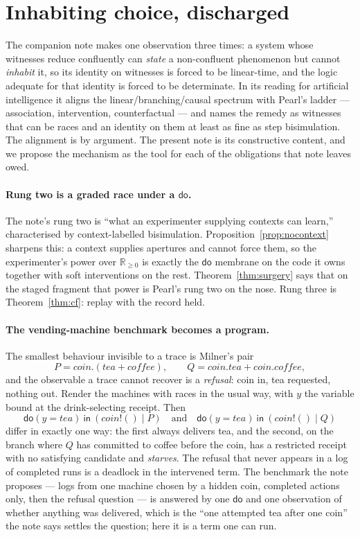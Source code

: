 \documentclass[11pt,a4paper]{article}
\theoremstyle{plain}
\theoremstyle{definition}
\theoremstyle{remark}
\newcommand{\Rnn}{\mathbb{R}_{\geq 0}}
\newcommand{\dok}{\textsf{do}}
\newcommand{\ink}{\textsf{in}}
\begin{document}
\section{Inhabiting choice, discharged}\label{sec:inhabiting}

The companion note \cite{Inhabiting} makes one observation three times: a
system whose witnesses reduce confluently can \emph{state} a non-confluent
phenomenon but cannot \emph{inhabit} it, so its identity on witnesses is forced
to be linear-time, and the logic adequate for that identity is forced to be
determinate. In its reading for artificial intelligence it aligns the
linear/branching/causal spectrum with Pearl's ladder --- association,
intervention, counterfactual --- and names the remedy as witnesses that can be
races and an identity on them at least as fine as step bisimulation. The
alignment is by argument. The present note is its constructive content, and we
propose the mechanism as the tool for each of the obligations that note leaves
owed.

\paragraph{Rung two is a graded race under a $\dok$.} The note's rung two is
``what an experimenter supplying contexts can learn,'' characterised by
context-labelled bisimulation. Proposition~\ref{prop:nocontext} sharpens this:
a context supplies apertures and cannot force them, so the experimenter's power
over $\Rnn$ is exactly the $\dok$ membrane on the code it owns together with
soft interventions on the rest. Theorem~\ref{thm:surgery} says that on the
staged fragment that power is Pearl's rung two on the nose. Rung three is
Theorem~\ref{thm:cf}: replay with the record held.

\paragraph{The vending-machine benchmark becomes a program.} The smallest
behaviour invisible to a trace is Milner's pair
\[
  P = \mathit{coin}.(\mathit{tea} + \mathit{coffee}), \qquad
  Q = \mathit{coin}.\mathit{tea} + \mathit{coin}.\mathit{coffee},
\]
and the observable a trace cannot recover is a \emph{refusal}: coin in, tea
requested, nothing out. Render the machines with races in the usual way, with
$y$ the variable bound at the drink-selecting receipt. Then
\[
  \dok(y = \mathit{tea})\ \ink\ (\mathit{coin}!() \mid P)
  \quad\text{and}\quad
  \dok(y = \mathit{tea})\ \ink\ (\mathit{coin}!() \mid Q)
\]
differ in exactly one way: the first always delivers tea, and the second, on
the branch where $Q$ has committed to coffee before the coin, has a restricted
receipt with no satisfying candidate and \emph{starves}. The refusal that never
appears in a log of completed runs is a deadlock in the intervened term. The
benchmark the note proposes --- logs from one machine chosen by a hidden coin,
completed actions only, then the refusal question --- is answered by one
$\dok$ and one observation of whether anything was delivered, which is the
``one attempted tea after one coin'' the note says settles the question; here it
is a term one can run.
\end{document}
